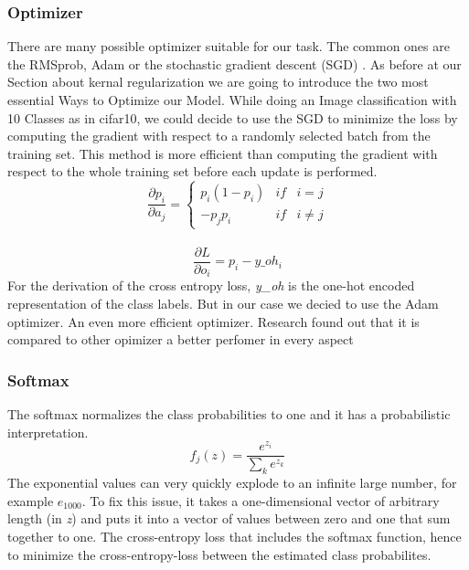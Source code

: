 \documentclass[journal]{IEEEtran}
\begin{document}
\subsubsection{Optimizer}
\noindent There are many possible optimizer suitable for our task. The common ones are the RMSprob, Adam or the stochastic gradient descent (SGD) \cite{RN1}. As before at our Section about kernal regularization we are going to introduce the two most essential Ways to Optimize our Model. While doing an Image classification with 10 Classes as in cifar10, we could decide to use the SGD to minimize the loss by computing the gradient with respect to a randomly selected batch from the training set. This method is more efficient than computing the gradient with respect to the whole training set before each update is performed. 
\begin{equation}
\frac{\partial p_i}{\partial a_j}=\left\{\begin{matrix} p_i(1-p_i) & if & i=j\\ -p_j p_i & if & i\neq j \end{matrix}\right.
\end{equation} \\
\begin{equation}
\frac{\partial L}{\partial o_i}=p_i-y\_oh_i
\end{equation} 
For the derivation of the cross entropy loss, \textit{y\_oh} is the one-hot encoded representation of the class labels. But in our case we decied to use the Adam optimizer. An even more efficient optimizer. Research found out that it is compared to other opimizer a better perfomer in every aspect \cite{AutomotivePlatformsAutonomousDriving} \cite{Adam}
\subsubsection{Softmax}
\noindent The softmax normalizes the class probabilities to one and it has a probabilistic interpretation. 
\begin{equation}
f_{j}(z) = \frac{e^{z_{i}}}{\sum_{k} e^{z_{k}}}
\end{equation}
The exponential values can very quickly explode to an infinite large number, for example \(e_{1000}\). To fix this issue, it takes a one-dimensional vector of arbitrary length (in \textit{z}) and puts it into a vector of values between zero and one that sum together to one. The cross-entropy loss that includes the softmax function, hence to minimize the cross-entropy-loss between the estimated class probabilites. \\
\end{document}
